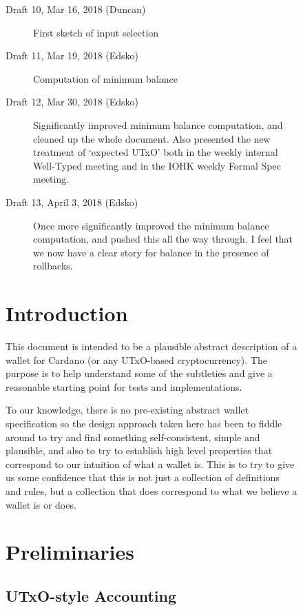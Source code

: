 \documentclass{article}
\theoremstyle{definition}{
  \newtheorem{lemma}{Lemma}[section] %
  \newtheorem{definition}[lemma]{Definition}
}
\theoremstyle{theorem}{
  \newtheorem{invariant}[lemma]{Invariant}
  \newtheorem{proofobligation}[lemma]{Proof Obligation}
}
\numberwithin{equation}{lemma}
\begin{document}
\begin{figure}
\begin{description}
\item[Draft 10, Mar 16, 2018 (Duncan)] First sketch of input selection
\item[Draft 11, Mar 19, 2018 (Edsko)] Computation of minimum balance
\item[Draft 12, Mar 30, 2018 (Edsko)] Significantly improved minimum balance computation,
     and cleaned up the whole document. Also presented the new treatment of `expected UTxO'
     both in the weekly internal Well-Typed meeting and in the IOHK weekly Formal Spec meeting.
\item[Draft 13, April 3, 2018 (Edsko)] Once more significantly improved the minimum
     balance computation, and pushed this all the way through. I feel that we now
     have a clear story for balance in the presence of rollbacks.
\end{description}

\section{Introduction}

This document is intended to be a plausible abstract description of a wallet
for Cardano (or any UTxO-based cryptocurrency). The purpose is to help
understand some of the subtleties and give a reasonable starting point for
tests and implementations.

To our knowledge, there is no pre-existing abstract wallet specification so the
design approach taken here has been to fiddle around to try and find something
self-consistent, simple and plausible, and also to try to establish high level
properties that correspond to our intuition of what a wallet is. This is to try
to give us some confidence that this is not just a collection of definitions
and rules, but a collection that does correspond to what we believe a wallet is
or does.

\section{Preliminaries}

\subsection{UTxO-style Accounting}

\begin{figure}


\end{figure}
\end{figure}
\end{document}
